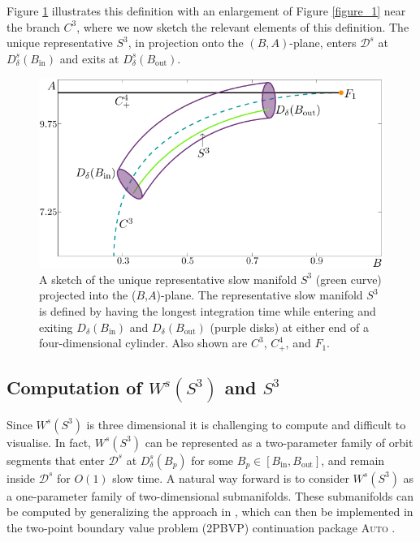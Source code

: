 \documentclass{ws-ijbc}
\begin{document}
Figure \ref{figure_2} illustrates this definition with an enlargement of Figure \ref{figure_1} near the branch $C^3$, where we now sketch the relevant elements of this definition. The unique representative $S^3$, in projection onto the $(B,A)$-plane, enters $\mathscr{D}^s$ at $D^s_\delta(B_{\mathrm{in}})$ and exits at $D^s_\delta(B_{\mathrm{out}})$.

\begin{figure}[!t]
\begin{center}
\includegraphics{./figures/MKMO_2.pdf}
\end{center}
\caption{A sketch of the unique representative slow manifold $S^3$ (green curve) projected into the ($B$,$A$)-plane.  The representative slow manifold $S^3$ is defined by having the longest integration time while entering and exiting  $D_\delta(B_{\mathrm{in}})$ and $D_\delta(B_{\mathrm{out}})$ (purple disks) at either end of a four-dimensional cylinder.  Also shown are $C^3$, $C^4_+$, and $F_1$.}
\label{figure_2}
\end{figure}

\subsection{Computation of $W^{s}(S^3)$ and  $S^3$}

Since $W^{s}(S^3)$ is three dimensional it is challenging to compute and difficult to visualise.  In fact, $W^{s}(S^3)$ can be represented as a two-parameter family of orbit segments that enter $\mathscr{D}^s$ at $D^s_{\delta}(B_p)$ for some $B_p \in [B_{\text{in}}, B_{\text{out}}]$, and remain inside $\mathscr{D}^s$ for $O(1)$ slow time.  A natural way forward is to consider $W^{s}(S^3)$ as a one-parameter family of two-dimensional submanifolds.  These submanifolds can be computed by generalizing the approach in \cite{Saeed_Paper}, which can then be implemented in the two-point boundary value problem (2PBVP) continuation package \textsc{Auto} \cite{AUTO}.  
\end{document}
